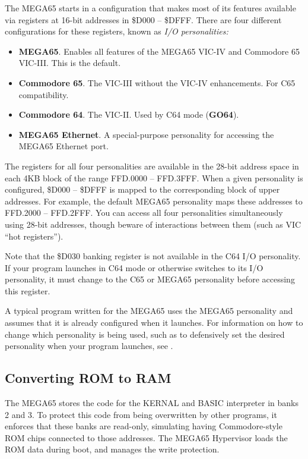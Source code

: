 The MEGA65 starts in a configuration that makes most of its features available
via registers at 16-bit addresses in \$D000 -- \$DFFF. There are four different
configurations for these registers, known as {\em I/O personalities:}

\begin{itemize}
\item {\bf MEGA65}. Enables all features of the MEGA65 VIC-IV and Commodore 65
VIC-III. This is the default.
\item {\bf Commodore 65}. The VIC-III without the VIC-IV enhancements. For C65 compatibility.
\item {\bf Commodore 64}. The VIC-II. Used by C64 mode (\textbf{GO64}).
\item {\bf MEGA65 Ethernet}. A special-purpose personality for accessing the
MEGA65 Ethernet port.
\end{itemize}

The registers for all four personalities are available in the 28-bit address
space in each 4KB block of the range FFD.0000 -- FFD.3FFF. When a given
personality is configured, \$D000 -- \$DFFF is mapped to the corresponding
block of upper addresses. For example, the default MEGA65 personality maps
these addresses to FFD.2000 -- FFD.2FFF. You can access all four personalities
simultaneously using 28-bit addresses, though beware of interactions between
them (such as VIC ``hot registers'').

Note that the \$D030 banking register is not available in the C64 I/O
personality. If your program launches in C64 mode or otherwise switches to its
I/O personality, it must change to the C65 or MEGA65 personality before
accessing this register.

A typical program written for the MEGA65 uses the MEGA65 personality and
assumes that it is already configured when it launches. For information on how
to change which personality is being used, such as to defensively set the
desired personality when your program launches, see .

\subsection{Converting ROM to RAM}

The MEGA65 stores the code for the KERNAL and BASIC interpreter in banks 2 and
3. To protect this code from being overwritten by other programs, it enforces
that these banks are read-only, simulating having Commodore-style ROM chips
connected to those addresses. The MEGA65 Hypervisor loads the ROM data during
boot, and manages the write protection.

